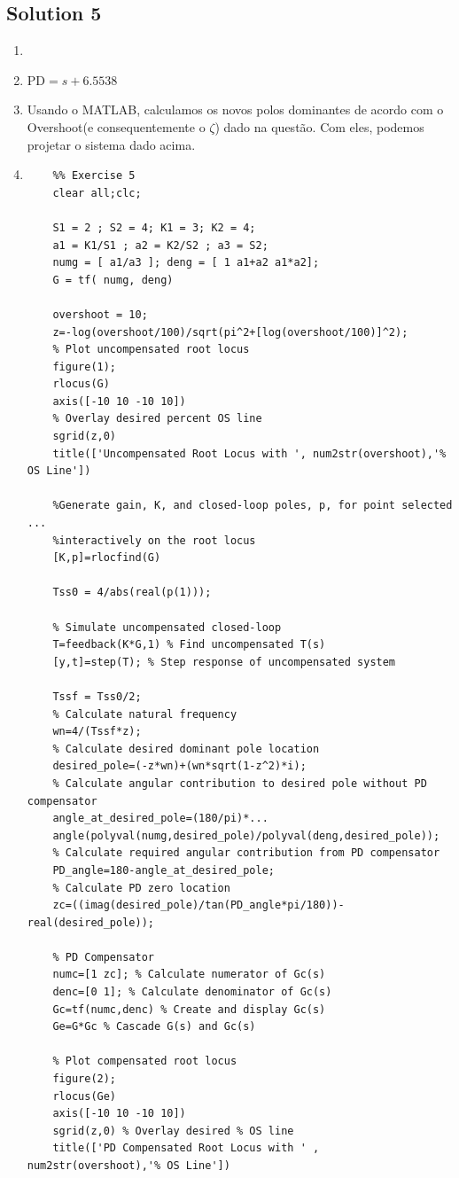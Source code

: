 \documentclass[a4paper,11pt]{article}
\begin{document}
\subsection*{Solution 5}
\begin{enumerate}
	\item 
	\item PD$= s + 6.5538 $
	\item Usando o MATLAB, calculamos os novos polos dominantes de acordo com o Overshoot(e consequentemente o $\zeta$) dado na questão. Com eles, podemos projetar o sistema dado acima.
	\item 
	\begin{lstlisting}
	%% Exercise 5
	clear all;clc;
	
	S1 = 2 ; S2 = 4; K1 = 3; K2 = 4;
	a1 = K1/S1 ; a2 = K2/S2 ; a3 = S2;
	numg = [ a1/a3 ]; deng = [ 1 a1+a2 a1*a2];
	G = tf( numg, deng)
	
	overshoot = 10;
	z=-log(overshoot/100)/sqrt(pi^2+[log(overshoot/100)]^2);
	% Plot uncompensated root locus
	figure(1);
	rlocus(G)
	axis([-10 10 -10 10])
	% Overlay desired percent OS line
	sgrid(z,0)
	title(['Uncompensated Root Locus with ', num2str(overshoot),'% OS Line'])
	
	%Generate gain, K, and closed-loop poles, p, for point selected ...
	%interactively on the root locus
	[K,p]=rlocfind(G)
	
	Tss0 = 4/abs(real(p(1)));
	
	% Simulate uncompensated closed-loop
	T=feedback(K*G,1) % Find uncompensated T(s)
	[y,t]=step(T); % Step response of uncompensated system
	
	Tssf = Tss0/2;
	% Calculate natural frequency
	wn=4/(Tssf*z);
	% Calculate desired dominant pole location
	desired_pole=(-z*wn)+(wn*sqrt(1-z^2)*i);
	% Calculate angular contribution to desired pole without PD compensator
	angle_at_desired_pole=(180/pi)*...
	angle(polyval(numg,desired_pole)/polyval(deng,desired_pole));
	% Calculate required angular contribution from PD compensator
	PD_angle=180-angle_at_desired_pole;
	% Calculate PD zero location
	zc=((imag(desired_pole)/tan(PD_angle*pi/180))-real(desired_pole));
	
	% PD Compensator
	numc=[1 zc]; % Calculate numerator of Gc(s)
	denc=[0 1]; % Calculate denominator of Gc(s)
	Gc=tf(numc,denc) % Create and display Gc(s)
	Ge=G*Gc % Cascade G(s) and Gc(s)
	
	% Plot compensated root locus
	figure(2);
	rlocus(Ge)
	axis([-10 10 -10 10])
	sgrid(z,0) % Overlay desired % OS line
	title(['PD Compensated Root Locus with ' , num2str(overshoot),'% OS Line'])
	

\end{lstlisting}
\end{enumerate}
\end{document}
